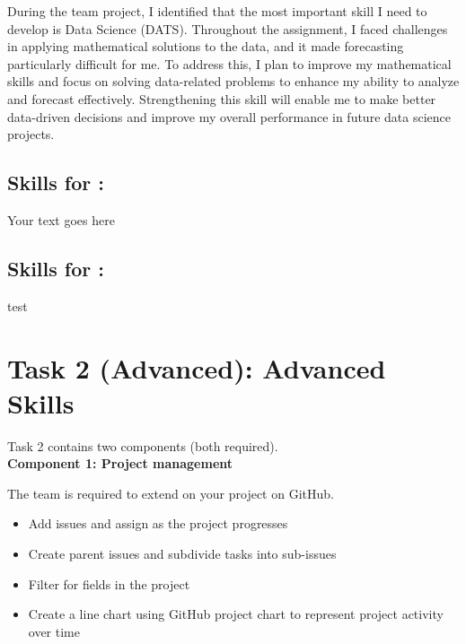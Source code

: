 \documentclass[a4paper, 11pt]{report}
\begin{document}
During the team project, I identified that the most important skill I need to develop is Data Science (DATS). Throughout the assignment, I faced challenges in applying mathematical solutions to the data, and it made forecasting particularly difficult for me. To address this, I plan to improve my mathematical skills and focus on solving data-related problems to enhance my ability to analyze and forecast effectively. Strengthening this skill will enable me to make better data-driven decisions and improve my overall performance in future data science projects.


\subsection{Skills for \majC: \studC}

Your text goes here

\subsection{Skills for \majD: \studD}

test



\newpage
\section{Task 2 (Advanced): Advanced Skills}

Task 2 contains two components (both required).\\[2mm]

\textbf{Component 1: Project management}

The team is required to extend on your project on GitHub.

\begin{itemize}
    \item Add issues and assign as the project progresses
    \item Create parent issues and subdivide tasks into sub-issues
    \item Filter for fields in the project
    \item Create a line chart using GitHub project chart to represent project activity over time
\end{itemize} 

\vspace{4ex}
\end{document}
